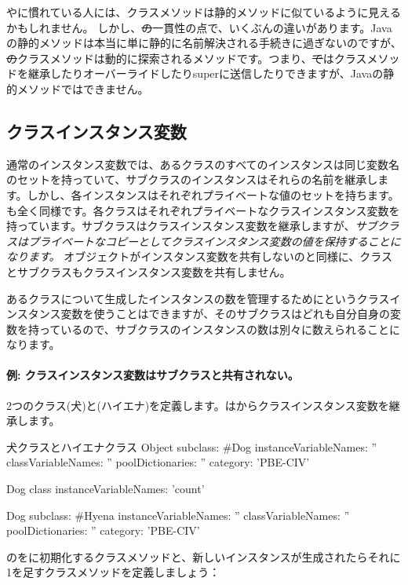 \documentclass[a4paper,10pt,twoside]{book}
\begin{document}
やに慣れている人には、クラスメソッドは静的メソッドに似ているように見えるかもしれません。
しかし、\st の一貫性の点で、いくぶんの違いがあります。Javaの静的メソッドは本当に単に静的に名前解決される手続きに過ぎないのですが、\st のクラスメソッドは動的に探索されるメソッドです。つまり、\st ではクラスメソッドを継承したりオーバーライドしたりsuperに送信したりできますが、Javaの静的メソッドではできません。

\subsection{クラスインスタンス変数}
通常のインスタンス変数では、あるクラスのすべてのインスタンスは同じ変数名のセットを持っていて、サブクラスのインスタンスはそれらの名前を継承します。しかし、各インスタンスはそれぞれプライベートな値のセットを持ちます。も全く同様です。各クラスはそれぞれプライベートなクラスインスタンス変数を持っています。サブクラスはクラスインスタンス変数を継承しますが、\emph{サブクラスはプライベートなコピーとしてクラスインスタンス変数の値を保持することになります。} オブジェクトがインスタンス変数を共有しないのと同様に、クラスとサブクラスもクラスインスタンス変数を共有しません。

あるクラスについて生成したインスタンスの数を管理するためにというクラスインスタンス変数を使うことはできますが、そのサブクラスはどれも自分自身の変数を持っているので、サブクラスのインスタンスの数は別々に数えられることになります。

\paragraph{例: クラスインスタンス変数はサブクラスと共有されない。}
2つのクラス(犬)と(ハイエナ)を定義します。はからクラスインスタンス変数を継承します。

\begin{classdef}[dog]{犬クラスとハイエナクラス}
Object subclass: #Dog
	instanceVariableNames: ''
	classVariableNames: ''
	poolDictionaries: ''
	category: 'PBE-CIV'

Dog class
	instanceVariableNames: 'count'

Dog subclass: #Hyena
	instanceVariableNames: ''
	classVariableNames: ''
	poolDictionaries: ''
	category: 'PBE-CIV'
\end{classdef}

のをに初期化するクラスメソッドと、新しいインスタンスが生成されたらそれに1を足すクラスメソッドを定義しましょう：
\end{document}
